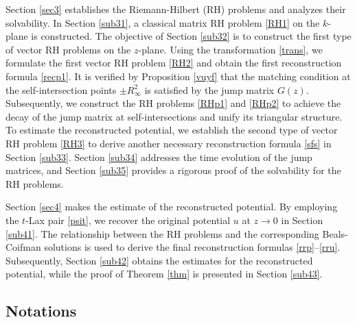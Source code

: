 \documentclass[preprint,compress,12pt]{elsarticle}
\numberwithin{equation}{section}
\begin{document}
Section \ref{sec3} establishes the Riemann-Hilbert (RH) problems and analyzes their solvability.
In Section \ref{sub31}, a classical matrix RH problem \ref{RH1} on the $k$-plane is constructed.
The objective of Section \ref{sub32} is to construct the first type of vector RH problems on the $z$-plane. Using the transformation \eqref{trans}, we formulate the first vector RH problem \ref{RH2} and obtain the first reconstruction formula \eqref{recp1}. It is verified by Proposition \ref{vuyf} that the matching condition at the self-intersection points $\pm R_{\infty}^{2}$ is satisfied by the jump matrix $G(z)$. Subsequently, we construct the RH problems \ref{RHp1} and \ref{RHp2} to achieve the decay of the jump matrix at self-intersections and unify its triangular structure.
To estimate the reconstructed potential, we establish the second type of vector RH problem \ref{RH3} to derive another necessary reconstruction formula \eqref{sfs} in Section \ref{sub33}.  Section \ref{sub34} addresses the time evolution of the jump matrices, and Section \ref{sub35} provides a rigorous proof of the solvability for the RH problems.

Section \ref{sec4} makes the estimate  of the reconstructed potential. By employing the $t$-Lax pair \eqref{psit}, we recover the original potential $u$ at $z\to0$ in Section \ref{sub41}. The relationship between the RH problems and the corresponding Beals-Coifman solutions is used to derive the final reconstruction formulas \eqref{rrp}--\eqref{rru}. Subsequently, Section \ref{sub42} obtains  the estimates for the reconstructed potential, while the proof of Theorem \ref{thm} is presented in Section \ref{sub43}.


\subsection{Notations}
\end{document}
